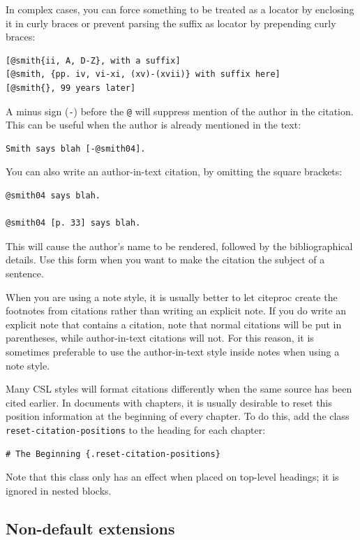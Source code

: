 \documentclass[
]{article}
\begin{document}
In complex cases, you can force something to be treated as a locator by
enclosing it in curly braces or prevent parsing the suffix as locator by
prepending curly braces:

\begin{verbatim}
[@smith{ii, A, D-Z}, with a suffix]
[@smith, {pp. iv, vi-xi, (xv)-(xvii)} with suffix here]
[@smith{}, 99 years later]
\end{verbatim}

A minus sign (\texttt{-}) before the \texttt{@} will suppress mention of
the author in the citation. This can be useful when the author is
already mentioned in the text:

\begin{verbatim}
Smith says blah [-@smith04].
\end{verbatim}

You can also write an author-in-text citation, by omitting the square
brackets:

\begin{verbatim}
@smith04 says blah.

@smith04 [p. 33] says blah.
\end{verbatim}

This will cause the author's name to be rendered, followed by the
bibliographical details. Use this form when you want to make the
citation the subject of a sentence.

When you are using a note style, it is usually better to let citeproc
create the footnotes from citations rather than writing an explicit
note. If you do write an explicit note that contains a citation, note
that normal citations will be put in parentheses, while author-in-text
citations will not. For this reason, it is sometimes preferable to use
the author-in-text style inside notes when using a note style.

Many CSL styles will format citations differently when the same source
has been cited earlier. In documents with chapters, it is usually
desirable to reset this position information at the beginning of every
chapter. To do this, add the class \texttt{reset-citation-positions} to
the heading for each chapter:

\begin{verbatim}
# The Beginning {.reset-citation-positions}
\end{verbatim}

Note that this class only has an effect when placed on top-level
headings; it is ignored in nested blocks.

\hypertarget{non-default-extensions}{%
\subsection{Non-default extensions}\label{non-default-extensions}}
\end{document}
